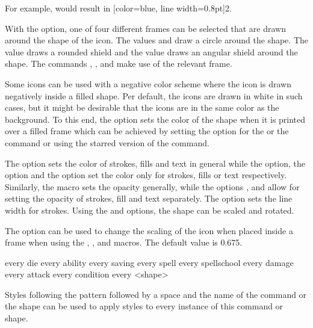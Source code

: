 \documentclass[a4paper]{article}
\begin{document}
For example,  would result in [color=blue, line width=0.8pt]{2}.

With the  option, one of four different frames can be selected that are drawn around the shape of the icon. The values  and  draw a circle around the shape. The value  draws a rounded shield and the value  draws an angular shield around the shape. The commands \macro{\ability}, \macro{\saving}, \macro{\spellschool} and \macro{\damage} make use of the relevant frame.

Some icons can be used with a negative color scheme where the icon is drawn negatively inside a filled shape. Per default, the icons are drawn in white in such cases, but it might be desirable that the icons are in the same color as the background. To this end, the  option sets the color of the shape when it is printed over a filled frame which can be achieved by setting the  option for the \macro{\ability} or the \macro{\spellschool} command or using the starred version of the \macro{\RPGIconsUseIcon} command.

The  option sets the color of strokes, fills and text in general while the  option, the  option and the  option set the color only for strokes, fills or text respectively. Similarly, the  macro sets the opacity generally, while the options ,  and  allow for setting the opacity of strokes, fill and text separately. The option  sets the line width for strokes. Using the  and  options, the shape can be scaled and rotated.

The  option can be used to change the scaling of the icon when placed inside a frame when using the \macro{\ability}, \macro{\saving}, \macro{\spellschool} and \macro{\damage} macros. The default value is 0.675.

\begin{macrodef}
every die
every ability
every saving
every spell
every spellschool
every damage
every attack
every condition
every <shape>
\end{macrodef}
Styles following the pattern  followed by a space and the name of the command or the shape can be used to apply styles to every instance of this command or shape.
\end{document}
